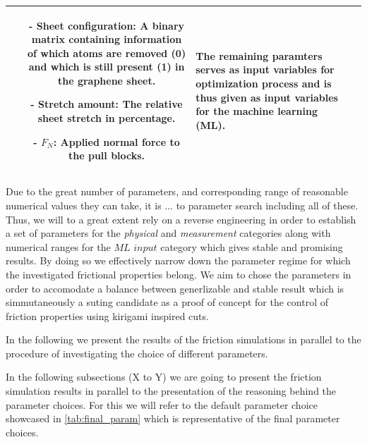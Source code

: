 \begin{table}[H]
\begin{center}
\begin{tabular}{ | c | m{8cm}| m{5cm}|}
\begin{itemize}
      \item[-] Sheet configuration: A binary matrix containing information of which atoms are removed (0) and which is still present (1) in the graphene sheet. 
      \item[-] Stretch amount: The relative sheet stretch in percentage.
      \item[-] $F_N$: Applied normal force to the pull blocks.
    \end{itemize} &
    The remaining paramters serves as input variables for optimization process and is thus given as input variables for the machine learning (ML). 
    \\ \hline
  \end{tabular}
  \end{center}
\end{table}




Due to the great number of parameters, and corresponding range of reasonable numerical values they can take, it is ... to parameter search including all of these. Thus, we will to a great extent rely on a reverse engineering in order to establish a set of parameters for the \textit{physical} and \textit{measurement} categories along with numerical ranges for the $\textit{ML input}$ category which gives stable and promising results. By doing so we effectively narrow down the parameter regime for which the investigated frictional properties belong. We aim to chose the parameters in order to accomodate a balance between generlizable and stable result which is simmutaneously a suting candidate as a proof of concept for the control of friction properties using kirigami inspired cuts. 

In the following we present the results of the friction simulations in parallel to the procedure of investigating the choice of different parameters. 

In the following subsections (X to Y) we are going to present the friction simulation results in parallel to the presentation of the reasoning behind the parameter choices. For this we will refer to the default parameter choice showcased in \cref{tab:final_param} which is representative of the final parameter choices. 




